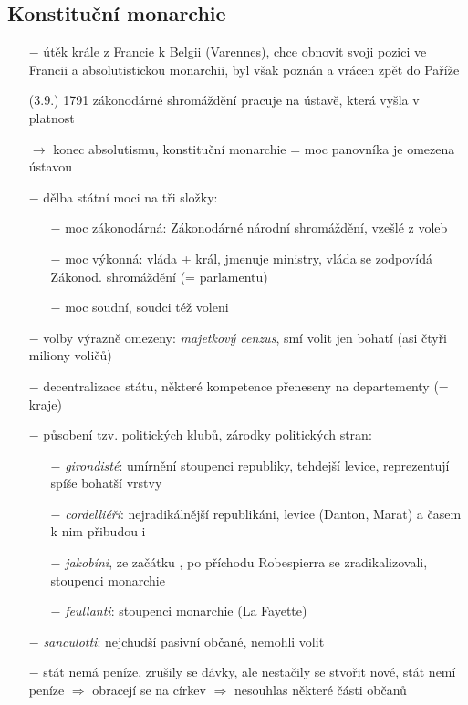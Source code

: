 \documentclass{article}
\begin{document}
\subsection*{Konstituční monarchie}
\begin{itemize}
    \vspace{-0.5em}
    \setlength\itemsep{0.15em}
    \item[$-$] útěk krále z Francie k Belgii (Varennes), chce obnovit svoji pozici ve Francii a absolutistickou monarchii, byl však poznán a vrácen zpět do Paříže
    \item[(3.9.) 1791] zákonodárné shromáždění pracuje na ústavě, která vyšla v platnost
    \item[$\rightarrow$] konec absolutismu, konstituční monarchie = moc panovníka je omezena ústavou
    \item[$-$] dělba státní moci na tři složky:
    \begin{itemize}
        \vspace{-0.5em}
        \setlength\itemsep{0.15em}
        \item[$-$] moc zákonodárná: Zákonodárné národní shromáždění, vzešlé z voleb
        \item[$-$] moc výkonná: vláda + král, jmenuje ministry, vláda se zodpovídá Zákonod. shromáždění (= parlamentu)
        \item[$-$] moc soudní, soudci též voleni
    \end{itemize}
    \item[$-$] volby výrazně omezeny: \textit{majetkový cenzus}, smí volit jen bohatí (asi čtyři miliony voličů)
    \item[$-$] decentralizace státu, některé kompetence přeneseny na departementy (= kraje)
    \item[$-$] působení tzv. politických klubů, zárodky politických stran:
    \begin{itemize}
        \vspace{-0.5em}
        \setlength\itemsep{0.15em}
        \item[$-$] \textit{girondisté}: umírnění stoupenci republiky, tehdejší levice, reprezentují spíše bohatší vrstvy
        \item[$-$] \textit{cordelliéři}: nejradikálnější republikáni, levice (Danton, Marat) a časem k nim přibudou i \item[$-$] \textit{jakobíni}, ze začátku , po příchodu Robespierra se zradikalizovali, stoupenci monarchie
        \item[$-$] \textit{feullanti}: stoupenci monarchie (La Fayette)
    \end{itemize}
    \item[$-$] \textit{sanculotti}: nejchudší pasivní občané, nemohli volit
    \item[$-$] stát nemá peníze, zrušily se dávky, ale nestačily se stvořit nové, stát nemí peníze $\Rightarrow$ obracejí se na církev $\Rightarrow$ nesouhlas některé části občanů
\end{itemize}
\end{document}
